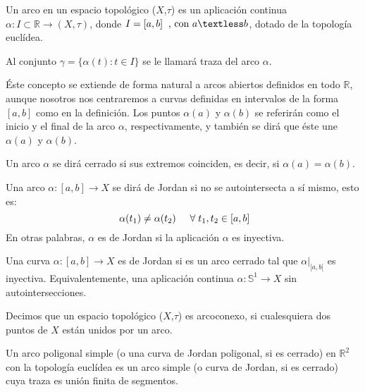 \documentclass[12pt,a4paper,oldfontcommands]{memoir}
\begin{document}
\begin{definition}
	Un arco en un espacio topológico ($X$,$\tau$) es un aplicación continua $\alpha: I\subset \mathbb{R} \rightarrow (X,\tau)$, donde $I = [a,b] \hspace{0.2cm} \text{, con } a \textless b$, dotado de la topología euclídea.
\end{definition}

Al conjunto $\gamma = \{ \alpha(t) : t \in I \}$ se le llamará traza del arco $\alpha$.

Éste concepto se extiende de forma natural a arcos abiertos definidos en todo $\mathbb{R}$, aunque nosotros nos centraremos a curvas definidas en intervalos de la forma $[a,b]$ como en la definición. Los puntos  $\alpha(a)$ y $\alpha(b)$ se referirán como el inicio y el final de la arco $\alpha$, respectivamente, y también se dirá que éste une $\alpha(a)$ y $\alpha(b)$.

\begin{definition}
	Un arco $\alpha$ se dirá cerrado si sus extremos coinciden, es decir, si $\alpha(a) = \alpha(b)$.
\end{definition}

\begin{definition}
	Una arco $\alpha\colon [a,b]\to X$ se dirá de Jordan si no se autointersecta a sí mismo, esto es:\[\ \alpha(t_1) \neq \alpha(t_2) \hspace{0.5cm}\forall \hspace{0.1cm}t_1,t_2 \in [a,b] \]
En otras palabras, $\alpha$ es de Jordan  si la aplicación $\alpha$ es inyectiva.
\end{definition}



\begin{definition}
	Una curva $\alpha : [a,b] \rightarrow X$ es de Jordan si es un arco cerrado tal que $\alpha \vert_{[a,b[}$ es inyectiva. Equivalentemente, una aplicación continua $\alpha : \mathbb{S}^1 \rightarrow X$ sin autointersecciones.
\end{definition}

\begin{definition}
	Decimos que un espacio topológico ($X$,$\tau$) es arcoconexo, si cualesquiera dos puntos de $X$ están unidos por un arco.
\end{definition}

\begin{definition}
	Un arco poligonal simple (o una curva de Jordan poligonal, si es cerrado) en $\mathbb{R}^2$ con la topología euclídea es un arco simple (o curva de Jordan, si es cerrado) cuya traza es  unión finita de segmentos.
\end{definition}
\end{document}
